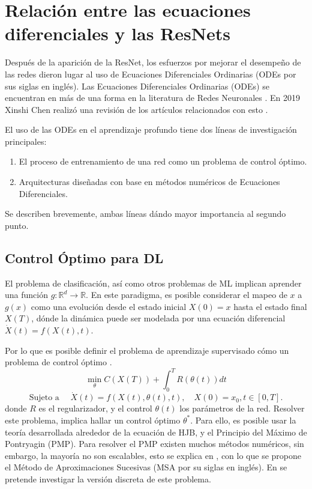 \chapter{Relación entre las ecuaciones diferenciales y las ResNets}
\label{odes_and_resnets}
Después de la aparición de la ResNet, los esfuerzos por mejorar el desempeño de las redes dieron lugar al uso de Ecuaciones Diferenciales Ordinarias (ODEs por sus siglas en inglés).
Las Ecuaciones Diferenciales Ordinarias (ODEs) se encuentran en más de una forma en la literatura de Redes Neuronales \cite{numerical_ode_and_architectures, DBLP:journals/corr/LiaoP16 }. En 2019 Xinshi Chen realizó una revisión de los artículos relacionados con esto \cite{odes_and_ml_survey}.

El uso de las ODEs en el aprendizaje profundo tiene dos líneas de investigación principales:
\begin{enumerate}
   \item El proceso de entrenamiento de una red como un problema de control óptimo.
   \item Arquitecturas diseñadas con base en métodos numéricos de Ecuaciones Diferenciales.
\end{enumerate}
Se describen brevemente, ambas líneas dándo mayor importancia al segundo punto.
\section{Control Óptimo para DL}
El problema de clasificación, así como otros problemas de ML implican aprender una función $g: \mathbb R^d \to \mathbb R$. En este paradigma, es posible considerar el mapeo de $x$ a $g(x)$ como una evolución desde el estado inicial  $X(0) = x$ hasta el estado final $X(T)$, dónde la dinámica puede ser modelada por una ecuación diferencial $\dot X(t) = f(X(t), t)$.

Por lo que es posible definir el problema de aprendizaje supervisado cómo un problema de control óptimo \cite{optimal_control_approach, mean_field_optimal_control}.
\begin{equation}
   \min_{\theta} C(X(T)) + \int_{0}^T R(\theta(t))dt
\end{equation}
\begin{equation}
   \text{Sujeto a } \quad \dot X(t) = f(X(t), \theta(t), t), \quad X(0) = x_0, t\in [0,T].
\end{equation}
donde $R$ es el regularizador, y el control $\theta(t)$ los parámetros de la red. Resolver este problema, implica hallar un control óptimo $\theta^*$. Para ello, es posible usar la teoría desarrollada alrededor de la ecuación de HJB, y el Principio del Máximo de Pontryagin (PMP). Para resolver el PMP existen muchos métodos numéricos, sin embargo, la mayoría no son escalables, esto se explica en \cite{PMP_for_DL}, con lo que se propone el Método de Aproximaciones Sucesivas (MSA por su siglas en inglés). En \cite{DL_as_OCP} se pretende investigar la versión discreta de este problema. 
